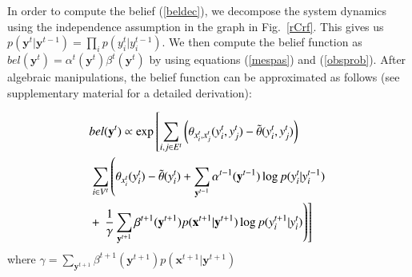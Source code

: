 In order to compute the belief (\ref{beldec}), we decompose
the system dynamics using the independence assumption in the graph in Fig.~\ref{rCrf}.
This gives us \mbox{$p(\mathbf{y}^t|\mathbf{y}^{t-1})=\prod_{i} p(y^t_i|y^{t-1}_i)$}.
%
%
We then compute the belief function as \mbox{$bel(\mathbf{y}^t)=\alpha^t(\mathbf{y}^t)\beta^t(\mathbf{y}^t)$} by using equations (\ref{mespas}) and (\ref{obsprob}). After algebraic manipulations, the belief function can be approximated as follows (see supplementary material for a detailed derivation):
\iffalse
\begin{equation}\small
	\begin{aligned}
&bel(\mathbf{y}^t) \propto \exp\left[  \sum_{i,j \in E^t} \left( \theta_{x^t_i,x^t_j}(y^t_i,y^t_j) - \tilde{\theta}(y^t_i,y^t_j) \right) \right. \\
&\left. \sum_{i \in V^t} \left( \theta_{x^t_i}(y^t_i) - \tilde{\theta}(y^t_i) +  \sum_{\mathbf{y^{t-1}}} \alpha^{t-1}(\mathbf{y}^{t-1}) \log p(y^t_i|y^{t-1}_i) \right. \right. \\
&+\left.\left.\sum_{\mathbf{y}^{t+1}} \beta^{t+1}(\mathbf{y}^{t+1}) p(\mathbf{x}^{t+1}|\mathbf{y}^{t+1}) \log p(y^t_i|y^{t-1}_i) \right) \right]
\end{aligned}
\label{crfbelief}
\end{equation}
\fi

\begin{equation}\small
  \begin{aligned}
&bel(\mathbf{y}^t) \propto \exp\left[  \sum_{i,j \in E^t} \left( \theta_{x^t_i,x^t_j}(y^t_i,y^t_j) - \tilde{\theta}(y^t_i,y^t_j) \right) \right. \\
&\left. \sum_{i \in V^t} \left( \theta_{x^t_i}(y^t_i) - \tilde{\theta}(y^t_i) +  \sum_{\mathbf{y}^{t-1}} \alpha^{t-1}(\mathbf{y}^{t-1}) \log p(y^t_i|y^{t-1}_i) \right. \right. \\
&+\left.\left.\frac{1}{\gamma}\sum_{\mathbf{y}^{t+1}} \beta^{t+1}(\mathbf{y}^{t+1}) p(\mathbf{x}^{t+1}|\mathbf{y}^{t+1}) \log p(y^{t+1}_i|y^{t}_i) \right) \right]
\end{aligned}
\label{crfbelief}
\end{equation}
where $\gamma=\sum_{\mathbf{y}^{t+1}} \beta^{t+1}(\mathbf{y}^{t+1}) p(\mathbf{x}^{t+1}|\mathbf{y}^{t+1})$

